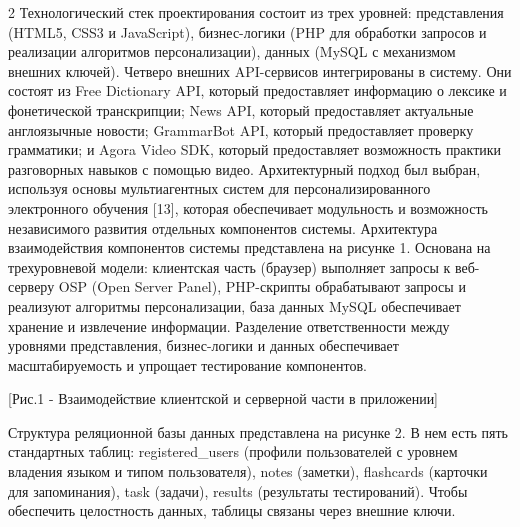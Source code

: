 \begin{multicols}{2}
Технологический стек проектирования состоит из трех уровней:
представления (HTML5, CSS3 и JavaScript), бизнес-логики (PHP для
обработки запросов и реализации алгоритмов персонализации), данных
(MySQL с механизмом внешних ключей). Четверо внешних API-сервисов
интегрированы в систему. Они состоят из Free Dictionary API, который
предоставляет информацию о лексике и фонетической транскрипции; News
API, который предоставляет актуальные англоязычные новости; GrammarBot
API, который предоставляет проверку грамматики; и Agora Video SDK,
который предоставляет возможность практики разговорных навыков с помощью
видео. Архитектурный подход был выбран, используя основы мультиагентных
систем для персонализированного электронного обучения {[}13{]}, которая
обеспечивает модульность и возможность независимого развития отдельных
компонентов системы. Архитектура взаимодействия компонентов системы
представлена на рисунке 1. Основана на трехуровневой модели: клиентская
часть (браузер) выполняет запросы к веб-серверу OSP (Open Server Panel),
PHP-скрипты обрабатывают запросы и реализуют алгоритмы персонализации,
база данных MySQL обеспечивает хранение и извлечение информации.
Разделение ответственности между уровнями представления, бизнес-логики и
данных обеспечивает масштабируемость и упрощает тестирование
компонентов.

[Рис.1 - Взаимодействие клиентской и серверной части в
приложении]

Структура реляционной базы данных представлена на рисунке 2. В нем есть
пять стандартных таблиц: registered\_users (профили пользователей с
уровнем владения языком и типом пользователя), notes (заметки),
flashcards (карточки для запоминания), task (задачи), results
(результаты тестирований). Чтобы обеспечить целостность данных, таблицы
связаны через внешние ключи.


\end{multicols}
